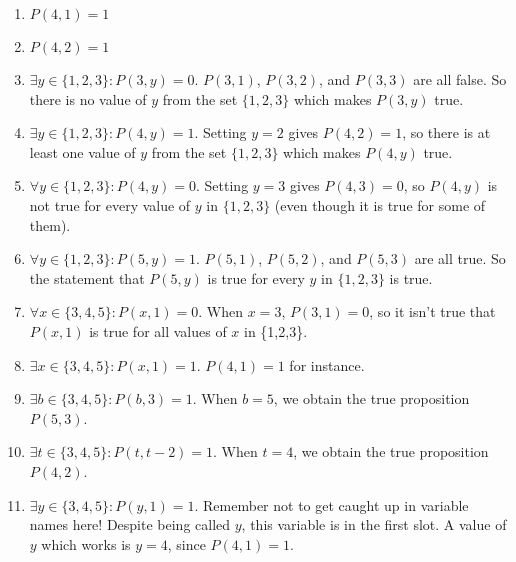 \begin{solutions}
	
	\begin{enumerate}
		\item $P(4,1) = 1$
		\item $P(4,2) = 1 $
		\item $\exists y \in \{1,2,3\}: P(3,y) = 0$.  $P(3,1)$, $P(3,2)$, and $P(3,3)$ are all false.  So there is no value of $y$ from the set $\{1,2,3\}$ which makes $P(3,y)$ true.
		\item $\exists y  \in \{1,2,3\}: P(4,y) = 1$.  Setting $y=2$ gives $P(4,2) = 1$, so there is at least one value of $y$ from the set $\{1,2,3\}$ which makes $P(4,y)$ true.
		\item $\forall y  \in \{1,2,3\}: P(4,y) = 0$. Setting  $y = 3$ gives $P(4,3) = 0$, so $P(4,y)$ is not true for every value of $y$ in $\{1,2,3\}$ (even though it is true for some of them).
		\item $\forall y  \in \{1,2,3\}: P(5,y) = 1$.  $P(5,1)$, $P(5,2)$, and $P(5,3)$ are all true.  So the statement that $P(5,y)$ is true for every $y$ in $\{1,2,3\}$ is true.
		\item $\forall x  \in \{3,4,5\}: P(x, 1) = 0$.  When $x = 3$, $P(3, 1) = 0$, so it isn't true that $P(x,1)$ is true for all values of $x$ in \{1,2,3\}.
		\item $\exists x  \in \{3,4,5\}: P(x,1) = 1$.  $P(4,1) = 1$ for instance.
		\item $\exists b  \in \{3,4,5\}: P(b, 3) = 1$.  When $b = 5$, we obtain the true proposition $P(5,3)$.
		\item $\exists t  \in \{3,4,5\}: P(t, t-2) = 1$.  When $t = 4$, we obtain the true proposition $P(4,2)$.  
		\item $\exists y  \in \{3,4,5\}: P(y,1) = 1$.  Remember not to get caught up in variable names here!  Despite being called $y$, this variable is in the first slot.  A value of $y$ which works is $y = 4$, since $P(4,1) = 1$. 
	\end{enumerate}
	
\end{solutions} 

